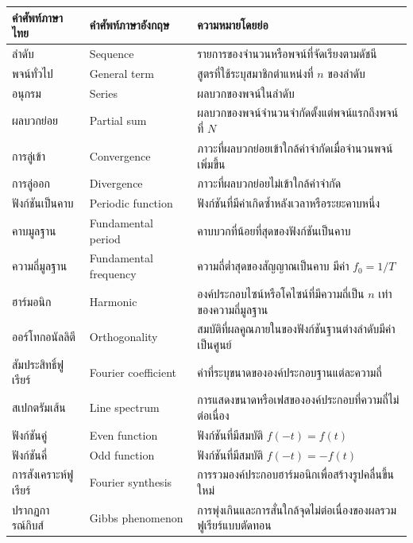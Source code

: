\begin{table}[htbp]
    \centering
    \begin{tabularx}{\textwidth}{L{0.18\textwidth} L{0.23\textwidth} Y}
        \hline
        \textbf{คำศัพท์ภาษาไทย} & \textbf{คำศัพท์ภาษาอังกฤษ} & \textbf{ความหมายโดยย่อ} \\
        \hline
        ลำดับ & Sequence & รายการของจำนวนหรือพจน์ที่จัดเรียงตามดัชนี \\
        พจน์ทั่วไป & General term & สูตรที่ใช้ระบุสมาชิกตำแหน่งที่ \(n\) ของลำดับ \\
        อนุกรม & Series & ผลบวกของพจน์ในลำดับ \\
        ผลบวกย่อย & Partial sum & ผลบวกของพจน์จำนวนจำกัดตั้งแต่พจน์แรกถึงพจน์ที่ \(N\) \\
        การลู่เข้า & Convergence & ภาวะที่ผลบวกย่อยเข้าใกล้ค่าจำกัดเมื่อจำนวนพจน์เพิ่มขึ้น \\
        การลู่ออก & Divergence & ภาวะที่ผลบวกย่อยไม่เข้าใกล้ค่าจำกัด \\
        ฟังก์ชันเป็นคาบ & Periodic function & ฟังก์ชันที่มีค่าเกิดซ้ำหลังเวลาหรือระยะคาบหนึ่ง \\
        คาบมูลฐาน & Fundamental period & คาบบวกที่น้อยที่สุดของฟังก์ชันเป็นคาบ \\
        ความถี่มูลฐาน & Fundamental frequency & ความถี่ต่ำสุดของสัญญาณเป็นคาบ มีค่า \(f_0=1/T\) \\
        ฮาร์มอนิก & Harmonic & องค์ประกอบไซน์หรือโคไซน์ที่มีความถี่เป็น \(n\) เท่าของความถี่มูลฐาน \\
        ออร์โทกอนัลลิตี & Orthogonality & สมบัติที่ผลคูณภายในของฟังก์ชันฐานต่างลำดับมีค่าเป็นศูนย์ \\
        สัมประสิทธิ์ฟูเรียร์ & Fourier coefficient & ค่าที่ระบุขนาดขององค์ประกอบฐานแต่ละความถี่ \\
        สเปกตรัมเส้น & Line spectrum & การแสดงขนาดหรือเฟสขององค์ประกอบที่ความถี่ไม่ต่อเนื่อง \\
        ฟังก์ชันคู่ & Even function & ฟังก์ชันที่มีสมบัติ \(f(-t)=f(t)\) \\
        ฟังก์ชันคี่ & Odd function & ฟังก์ชันที่มีสมบัติ \(f(-t)=-f(t)\) \\
        การสังเคราะห์ฟูเรียร์ & Fourier synthesis & การรวมองค์ประกอบฮาร์มอนิกเพื่อสร้างรูปคลื่นขึ้นใหม่ \\
        ปรากฏการณ์กิบส์ & Gibbs phenomenon & การพุ่งเกินและการสั่นใกล้จุดไม่ต่อเนื่องของผลรวมฟูเรียร์แบบตัดทอน \\
        \hline
    \end{tabularx}
\end{table}

